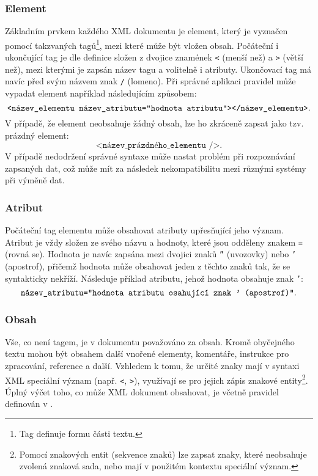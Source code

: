 \subsubsection{Element}
Základním prvkem každého XML dokumentu je element, který je vyznačen pomocí takzvaných tagů\footnote{Tag definuje formu části textu.}, mezi které může být vložen obsah. Počáteční i ukončující tag je dle definice \cite{w3cxml} složen z dvojice znamének \texttt{<} (menší než) a \texttt{>} (větší než), mezi kterými je zapsán název tagu a volitelně i atributy. Ukončovací tag má navíc před svým názvem znak \texttt{/} (lomeno). Při správné aplikaci pravidel může vypadat element například následujícím způsobem:
$$\texttt{<název\_elementu název\_atributu=\textquotedblright hodnota atributu\textquotedblright></název\_elementu>}.$$
V případě, že element neobsahuje žádný obsah, lze ho zkráceně zapsat jako tzv. prázdný element:
$$\texttt{<název\_prázdného\_elementu />}.$$
V případě nedodržení správné syntaxe může nastat problém při rozpoznávání zapsaných dat, což může mít za následek nekompatibilitu mezi různými systémy při výměně dat.

\subsubsection{Atribut}
Počáteční tag elementu může obsahovat atributy upřesňující jeho význam. Atribut je vždy složen ze svého názvu a hodnoty, které jsou odděleny znakem \texttt{=} (rovná se). Hodnota je navíc zapsána mezi dvojici znaků \texttt{\textquotedblright} (uvozovky) nebo \texttt{\textquoteright} (apostrof), přičemž hodnota může obsahovat jeden z těchto znaků tak, že se syntakticky nekříží. Následuje příklad atributu, jehož hodnota obsahuje znak \texttt{\textquoteright}:
$$\texttt{název\_atributu=\textquotedblright hodnota atributu osahující znak \textquoteright\ (apostrof)\textquotedblright}.$$

\subsubsection{Obsah}
Vše, co není tagem, je v dokumentu považováno za obsah. Kromě obyčejného textu mohou být obsahem další vnořené elementy, komentáře, instrukce pro zpracování, reference a další. Vzhledem k tomu, že určité znaky mají v syntaxi XML speciální význam (např. \texttt{<}, \texttt{>}), využívají se pro jejich zápis znakové entity\footnote{Pomocí znakových entit (sekvence znaků) lze zapsat znaky, které neobsahuje zvolená znaková sada, nebo mají v použitém kontextu speciální význam.}. Úplný výčet toho, co může XML dokument obsahovat, je včetně pravidel definován v \cite{w3cxml}.

